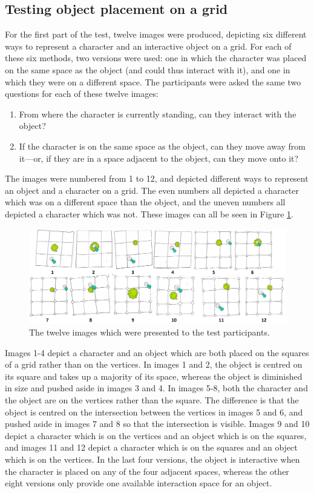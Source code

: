 \subsection{Testing object placement on a grid}
For the first part of the test, twelve images were produced, depicting six different ways to represent a character and an interactive object on a grid. For each of these six methods, two versions were used: one in which the character was placed on the same space as the object (and could thus interact with it), and one in which they were on a different space. The participants were asked the same two questions for each of these twelve images:

\begin{enumerate}
    \item From where the character is currently standing, can they interact with the object?
    \item If the character is on the same space as the object, can they move away from it---or, if they are in a space adjacent to the object, can they move onto it?
\end{enumerate}

The images were numbered from 1 to 12, and depicted different ways to represent an object and a character on a grid. The even numbers all depicted a character which was on a different space than the object, and the uneven numbers all depicted a character which was not. These images can all be seen in Figure \ref{fig:papergrid}.

\begin{figure}[h!]
	\centering
	\includegraphics[width=\textwidth]{figures/paper_0.png}
	\caption{The twelve images which were presented to the test participants. \label{fig:papergrid}}
\end{figure}

Images 1-4 depict a character and an object which are both placed on the squares of a grid rather than on the vertices. In images 1 and 2, the object is centred on its square and takes up a majority of its space, whereas the object is diminished in size and pushed aside in images 3 and 4. In images 5-8, both the character and the object are on the vertices rather than the square. The difference is that the object is centred on the intersection between the vertices in images 5 and 6, and pushed aside in images 7 and 8 so that the intersection is visible. Images 9 and 10 depict a character which is on the vertices and an object which is on the squares, and images 11 and 12 depict a character which is on the squares and an object which is on the vertices. In the last four versions, the object is interactive when the character is placed on any of the four adjacent spaces, whereas the other eight versions only provide one available interaction space for an object.


